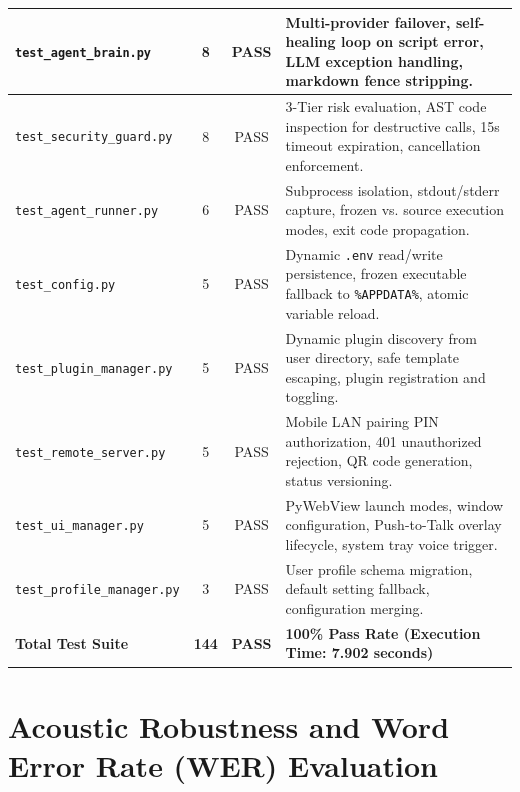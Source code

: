 \begin{table}[htbp]
\begin{tabularx}{\textwidth}{|l|c|c|X|}
\texttt{test\_agent\_brain.py} & 8 & PASS & Multi-provider failover, self-healing loop on script error, LLM exception handling, markdown fence stripping. \\ \hline
\texttt{test\_security\_guard.py} & 8 & PASS & 3-Tier risk evaluation, AST code inspection for destructive calls, 15s timeout expiration, cancellation enforcement. \\ \hline
\texttt{test\_agent\_runner.py} & 6 & PASS & Subprocess isolation, stdout/stderr capture, frozen vs. source execution modes, exit code propagation. \\ \hline
\texttt{test\_config.py} & 5 & PASS & Dynamic \texttt{.env} read/write persistence, frozen executable fallback to \texttt{\%APPDATA\%}, atomic variable reload. \\ \hline
\texttt{test\_plugin\_manager.py} & 5 & PASS & Dynamic plugin discovery from user directory, safe template escaping, plugin registration and toggling. \\ \hline
\texttt{test\_remote\_server.py} & 5 & PASS & Mobile LAN pairing PIN authorization, 401 unauthorized rejection, QR code generation, status versioning. \\ \hline
\texttt{test\_ui\_manager.py} & 5 & PASS & PyWebView launch modes, window configuration, Push-to-Talk overlay lifecycle, system tray voice trigger. \\ \hline
\texttt{test\_profile\_manager.py} & 3 & PASS & User profile schema migration, default setting fallback, configuration merging. \\ \hline
\textbf{Total Test Suite} & \textbf{144} & \textbf{PASS} & \textbf{100\% Pass Rate (Execution Time: 7.902 seconds)} \\ \hline
\end{tabularx}
\end{table}

\section{Acoustic Robustness and Word Error Rate (WER) Evaluation}

